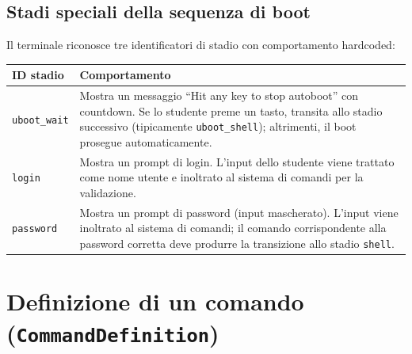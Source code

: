 \subsection{Stadi speciali della sequenza di boot}

Il terminale riconosce tre identificatori di stadio con comportamento hardcoded:

\begin{table}[H]
\centering
\begin{tabularx}{\textwidth}{lX}
\toprule
\textbf{ID stadio} & \textbf{Comportamento} \\
\midrule
\texttt{uboot\_wait} & Mostra un messaggio ``Hit any key to stop autoboot'' con countdown. Se lo studente preme un tasto, transita allo stadio successivo (tipicamente \texttt{uboot\_shell}); altrimenti, il boot prosegue automaticamente. \\
\texttt{login} & Mostra un prompt di login. L'input dello studente viene trattato come nome utente e inoltrato al sistema di comandi per la validazione. \\
\texttt{password} & Mostra un prompt di password (input mascherato). L'input viene inoltrato al sistema di comandi; il comando corrispondente alla password corretta deve produrre la transizione allo stadio \texttt{shell}. \\
\bottomrule
\end{tabularx}
\end{table}


\section{Definizione di un comando (\texttt{CommandDefinition})}

